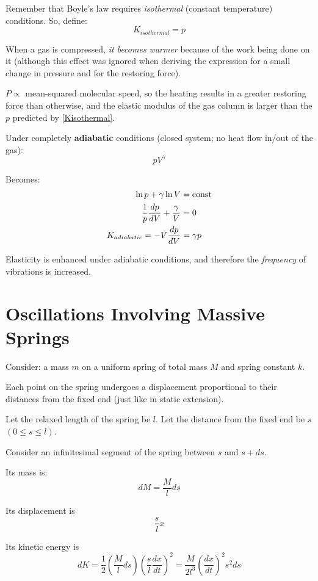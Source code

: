 \documentclass[11pt,letterpaper,titlepage,oneside]{book}
\begin{document}
Remember that Boyle's law requires \emph{isothermal} (constant temperature) conditions. So, define: \begin{equation} K_{isothermal} = p \label{Kisothermal} \end{equation} 
 
When a gas is compressed, \textit{it becomes warmer} because of the work being done on it (although this effect was ignored when deriving the expression for a small change in pressure and for the restoring force).

$P \propto$ mean-squared molecular speed, so the heating results in a greater restoring force than otherwise, and the elastic modulus of the gas column is larger than the $p$ predicted by \eqref{Kisothermal}.

Under completely \textbf{adiabatic} conditions (closed system; no heat flow in/out of the gas):
\begin{equation} pV^\gamma \end{equation}

Becomes:
\begin{align}
\ln p + \gamma\ln V &= \text{const} \notag \\
\frac{1}{p}\frac{dp}{dV} + \frac{\gamma}{V} &= 0 \notag \\
K_{adiabatic} = -V \frac{dp}{dV} &= \gamma p \label{Kadiabatic}
\end{align}

Elasticity is enhanced under adiabatic conditions, and therefore the \textit{frequency} of vibrations is increased.

\section{Oscillations Involving Massive Springs}
Consider: a mass $m$ on a uniform spring of total mass $M$ and spring constant $k$.

Each point on the spring undergoes a displacement proportional to their distances from the fixed end (just like in static extension).

Let the relaxed length of the spring be $l$. Let the distance from the fixed end be $s$ $(0 \leq s \leq l)$. 

Consider an infinitesimal segment of the spring between $s$ and $s + ds$.

Its mass is: \[ dM = \frac{M}{l} ds \] 

Its displacement is \[ \frac{s}{l} x \]

Its kinetic energy is \[ dK = \frac{1}{2}\left( \frac{M}{l} ds \right) \left( \frac{s}{l} \frac{dx}{dt} \right)^2 = \frac{M}{2l^3} \left( \frac{dx}{dt} \right)^2 s^2 ds \]
\end{document}
